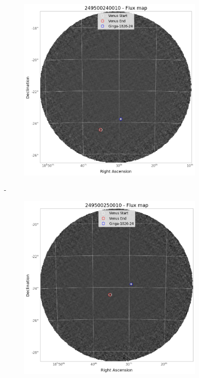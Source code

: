     \begin{figure}[H]
        \centering
        \begin{subfigure}{.45\textwidth}
            \includegraphics[width=\textwidth]{report/Figures/methods/2404/24_map.png}
        \end{subfigure}%
        \hspace{1em}-
        \begin{subfigure}{.45\textwidth}
            \centering
            \includegraphics[width=\textwidth]{report/Figures/methods/2404/25_map.png}

\end{subfigure}
\end{figure}
